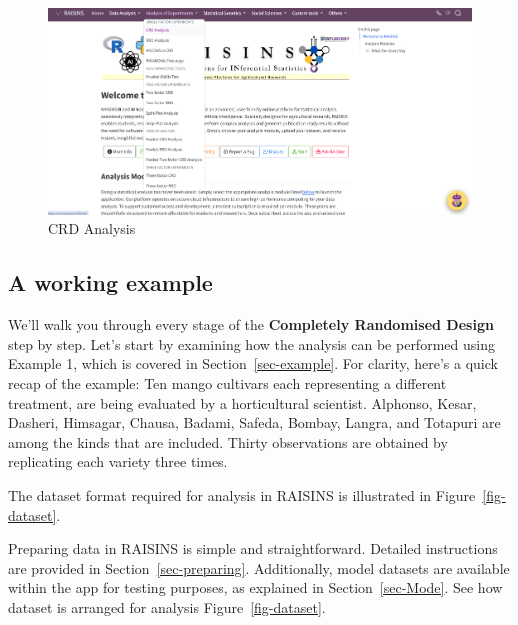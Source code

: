 \documentclass[
  letterpaper,
  DIV=11,
  numbers=noendperiod]{scrartcl}
\begin{document}
\begin{figure}

{\centering \includegraphics{CRD_1.webp}

}

\caption{CRD Analysis}

\end{figure}

\hypertarget{sec-aworkingex}{%
\subsection{A working example}\label{sec-aworkingex}}

We'll walk you through every stage of the \textbf{Completely Randomised
Design} step by step. Let's start by examining how the analysis can be
performed using Example 1, which is covered in
Section~\ref{sec-example}. For clarity, here's a quick recap of the
example: Ten mango cultivars each representing a different treatment,
are being evaluated by a horticultural scientist. Alphonso, Kesar,
Dasheri, Himsagar, Chausa, Badami, Safeda, Bombay, Langra, and Totapuri
are among the kinds that are included. Thirty observations are obtained
by replicating each variety three times.

The dataset format required for analysis in RAISINS is illustrated in
Figure~\ref{fig-dataset}.

Preparing data in RAISINS is simple and straightforward. Detailed
instructions are provided in Section~\ref{sec-preparing}. Additionally,
model datasets are available within the app for testing purposes, as
explained in Section~\ref{sec-Mode}. See how dataset is arranged for
analysis Figure~\ref{fig-dataset}.
\end{document}
